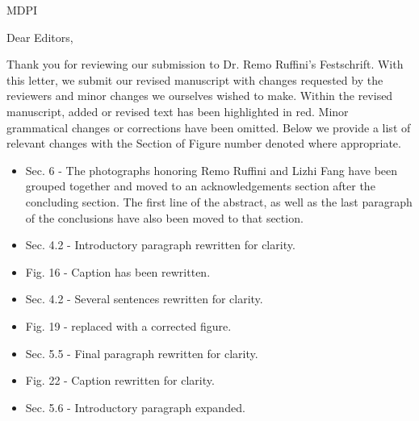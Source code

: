 \documentclass[a4paper, 10pt]{letter}
\begin{document}
\begin{letter}{MDPI}

\opening{Dear Editors,}

Thank you for reviewing our submission to Dr. Remo Ruffini's Festschrift. With this letter, we submit our revised manuscript with changes requested by the reviewers and minor changes we ourselves wished to make. Within the revised manuscript, added or revised text has been highlighted in red. Minor grammatical changes or corrections have been omitted. Below we provide a list of relevant changes with the Section of Figure number denoted where appropriate.

\begin{itemize}
    \item Sec. 6 - The photographs honoring Remo Ruffini and Lizhi Fang have been grouped together and moved to an acknowledgements section after the concluding section. The first line of the abstract, as well as the last paragraph of the conclusions have also been moved to that section.
    \item Sec. 4.2 - Introductory paragraph rewritten for clarity.
    \item Fig. 16 - Caption has been rewritten.
    \item Sec. 4.2 - Several sentences rewritten for clarity.
    \item Fig. 19 - replaced with a corrected figure.
    \item Sec. 5.5 - Final paragraph rewritten for clarity.
    \item Fig. 22 - Caption rewritten for clarity.
    \item Sec. 5.6 - Introductory paragraph expanded.
\end{itemize}


\end{letter}
\end{document}
